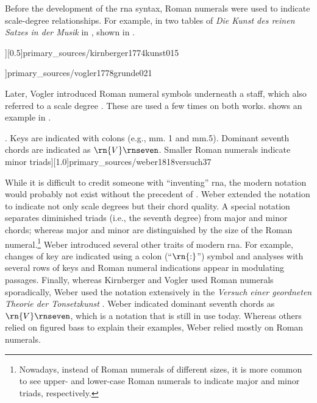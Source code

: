 



Before the development of the \gls{rna} syntax, Roman
numerals were used to indicate scale-degree relationships.
For example, in two tables of \emph{Die Kunst des reinen
Satzes in der Musik} in \textcite{kirnberger1774kunst},
shown in .

\phdfigure[Roman numerals in \textcite[p.
15]{kirnberger1774kunst}][0.5]{primary_sources/kirnberger1774kunst015}
 
\phdfigure[Roman numerals in
\textcite[Tab~XXI]{vogler1778grunde}]{primary_sources/vogler1778grunde021}

Later, Vogler introduced Roman numeral symbols underneath a
staff, which also referred to a scale degree
\parencite{vogler1778grunde, vogler1802handbuch}. These are
used a few times on both works.
 shows an
example in \textcite{vogler1778grunde}.

\phdfigure[Roman numerals in
\textcite[p.~37]{weber1818versuch}. Keys are indicated with
colons (e.g., mm. 1 and mm.5). Dominant seventh chords are
indicated as $\rn{V}\rnseven$. Smaller Roman numerals
indicate minor
triads][1.0]{primary_sources/weber1818versuch37}

While it is difficult to credit someone with ``inventing''
\gls{rna}, the modern notation would probably not exist
without the precedent of \textcite{weber1818versuch}. Weber
extended the notation to indicate not only scale degrees but
their chord quality. A special notation separates diminished
triads (i.e., the seventh degree) from major and minor
chords; whereas major and minor are distinguished by the
size of the Roman numeral.\footnote{Nowadays, instead of
Roman numerals of different sizes, it is more common to see
upper- and lower-case Roman numerals to indicate major and
minor triads, respectively.} Weber introduced several other
traits of modern \gls{rna}. For example, changes of key are
indicated using a colon (``$\rn{:}$'') symbol and analyses
with several rows of keys and Roman numeral indications
appear in modulating passages. Finally, whereas Kirnberger
and Vogler used Roman numerals sporadically, Weber used the
notation extensively in the
\emph{Versuch einer geordneten Theorie der Tonsetzkunst}
\parencite{weber1818versuch}. Weber indicated dominant
seventh chords as $\rn{V}\rnseven$, which is a notation that
is still in use today. Whereas others relied on figured bass
to explain their examples, Weber relied mostly on Roman
numerals.
